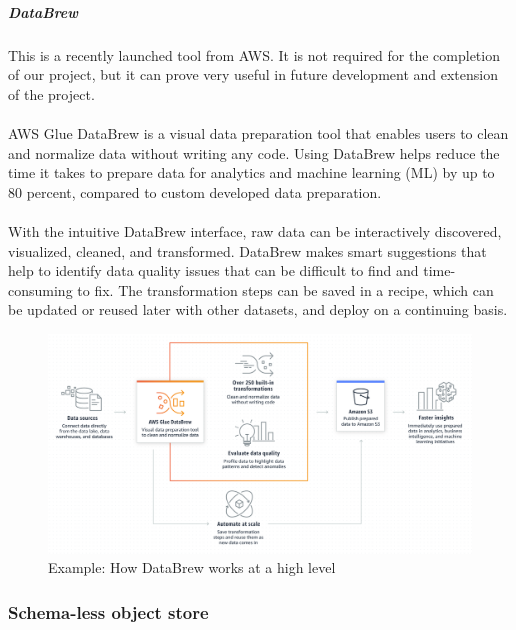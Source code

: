 \documentclass[10pt]{article}
\begin{document}
\subparagraph{DataBrew}
This is a recently launched tool from AWS. It is not required for the completion of our project, but it can prove very useful in future development and extension of the project. \\ \\
AWS Glue DataBrew is a visual data preparation tool that enables users to clean and normalize data without writing any code. Using DataBrew helps reduce the time it takes to prepare data for analytics and machine learning (ML) by up to 80 percent, compared to custom developed data preparation. \\ \\
With the intuitive DataBrew interface, raw data can be interactively discovered, visualized, cleaned, and transformed. DataBrew makes smart suggestions that help to identify data quality issues that can be difficult to find and time-consuming to fix. The transformation steps can be saved in a recipe, which can be updated or reused later with other datasets, and deploy on a continuing basis. \cite{aws-databrew}
\begin{figure}[h!]
	\centering
	\includegraphics[width=0.9\linewidth]{images/databrew-overview-diagram.png}
	\caption*{Example: How DataBrew works at a high level}
\end{figure}

\subsubsection{Schema-less object store}
\end{document}
